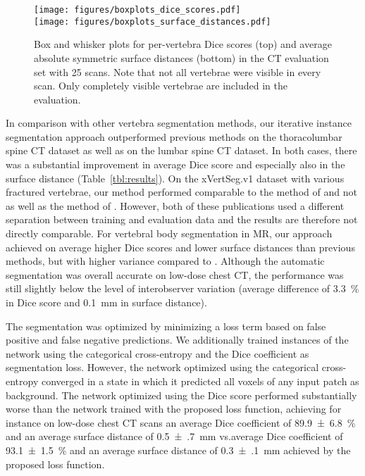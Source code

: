 \documentclass[authoryear,5p,final,times]{elsarticle}
\begin{document}
	\begin{figure}[t]
		\centering
		\texttt{[image: figures/boxplots\_dice\_scores.pdf]}
		\\
		\texttt{[image: figures/boxplots\_surface\_distances.pdf]}
		\caption{Box and whisker plots for per-vertebra Dice scores (top) and average absolute symmetric surface distances (bottom) in the CT evaluation set with 25 scans. Note that not all vertebrae were visible in every scan. Only completely visible vertebrae are included in the evaluation.}
		\label{fig:boxplots}
	\end{figure}
	
	In comparison with other vertebra segmentation methods, our iterative instance segmentation approach outperformed previous methods on the thoracolumbar spine CT dataset as well as on the lumbar spine CT dataset. In both cases, there was a substantial improvement in average Dice score and especially also in the surface distance (Table~\ref*{tbl:results}). On the xVertSeg.v1 dataset with various fractured vertebrae, our method performed comparable to the method of \citet{Sekuboyina2017} and not as well as the method of \citet{Janssens2018}. However, both of these publications used a different separation between training and evaluation data and the results are therefore not directly comparable. For vertebral body segmentation in MR, our approach achieved on average higher Dice scores and lower surface distances than previous methods, but with higher variance compared to \citet{Korez2016}.
	Although the automatic segmentation was overall accurate on low-dose chest CT, the performance was still slightly below the level of interobserver variation (average difference of \SI{3.3}{\percent} in Dice score and \SI{0.1}{\milli\meter} in surface distance).
	
	The segmentation was optimized by minimizing a loss term based on false positive and false negative predictions. We additionally trained instances of the network using the categorical cross-entropy and the Dice coefficient as segmentation loss. However, the network optimized using the categorical cross-entropy converged in a state in which it predicted all voxels of any input patch as background. The network optimized using the Dice score performed substantially worse than the network trained with the proposed loss function, achieving for instance on low-dose chest CT scans an average Dice coefficient of \SI{89.9(68)}{\percent} and an average surface distance of \SI{0.5(7)}{\milli\meter} vs.\an average Dice coefficient of \SI{93.1(15)}{\percent} and an average surface distance of \SI{0.3(1)}{\milli\meter} achieved by the proposed loss function.
	
\end{document}
